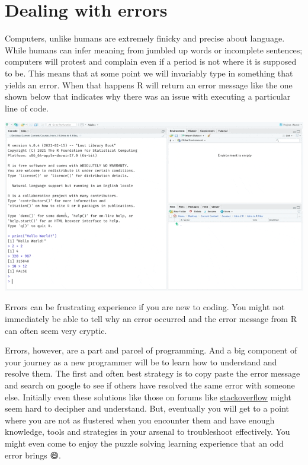 \documentclass[
]{book}
\begin{document}
\hypertarget{dealing-with-errors}{%
\section{Dealing with errors}\label{dealing-with-errors}}

Computers, unlike humans are extremely finicky and precise about language. While humans can infer meaning from jumbled up words or incomplete sentences; computers will protest and complain even if a period is not where it is supposed to be. This means that at some point we will invariably type in something that yields an error. When that happens R will return an error message like the one shown below that indicates why there was an issue with executing a particular line of code.

\includegraphics{assets/ch_1-setup/gifs/an_error.gif}

Errors can be frustrating experience if you are new to coding. You might not immediately be able to tell why an error occurred and the error message from R can often seem very cryptic.

Errors, however, are a part and parcel of programming. And a big component of your journey as a new programmer will be to learn how to understand and resolve them. The first and often best strategy is to copy paste the error message and search on google to see if others have resolved the same error with someone else. Initially even these solutions like those on forums like \href{https://stackoverflow.com/questions/14469486/r-issue-object-not-found}{stackoverflow} might seem hard to decipher and understand. But, eventually you will get to a point where you are not as flustered when you encounter them and have enough knowledge, tools and strategies in your arsenal to troubleshoot effectively. You might even come to enjoy the puzzle solving learning experience that an odd error brings 😄.
\end{document}
